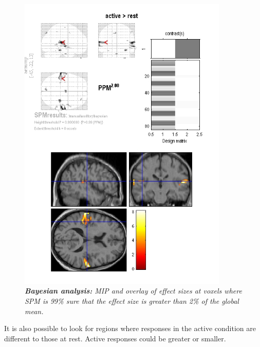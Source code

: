 \begin{figure}
\begin{center}
\includegraphics[width=100mm]{auditory/aud_bayes}
\caption{\em \textbf{Bayesian analysis:} MIP and overlay of effect sizes at voxels where SPM is 99\% sure that the effect size is greater than 2\% of the global mean. \label{aud_bayes} }
\end{center}
\end{figure}

It is also possible to look for regions where responses in the active condition are different to those at rest. Active responses could be greater or smaller.

